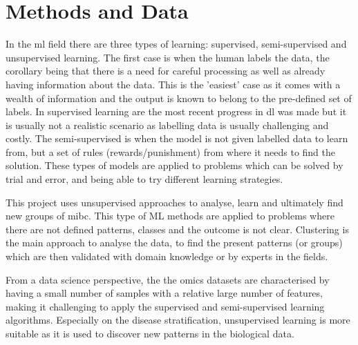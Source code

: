 \section{Methods and Data} \label{s:lit:computational}

\vspace{3mm}
\vspace{3mm}

In the \acrfull{ml} field there are three types of learning: supervised, semi-supervised and unsupervised learning. The first case is when the human labels the data, the corollary being that there is a need for careful processing as well as already having information about the data. This is the 'easiest' case as it comes with a wealth of information and the output is known to belong to the pre-defined set of labels. In supervised learning are the most recent progress in \acrfull{dl} was made but it is usually not a realistic scenario as labelling data is usually challenging and costly. The semi-supervised is when the model is not given labelled data to learn from, but a set of rules (rewards/punishment) from where it needs to find the solution. These types of models are applied to problems which can be solved by trial and error, and being able to try different learning strategies.

This project uses unsupervised approaches to analyse, learn and ultimately find new groups of \acrfull{mibc}. This type of ML methods are applied to problems where there are not defined patterns, classes and the outcome is not clear. Clustering is the main approach to analyse the data, to find the present patterns (or groups) which  are then validated with domain knowledge or by experts in the fields. 

From a data science perspective, the the omics datasets are characterised by having a small number of samples with a relative large number of features, making it challenging to apply the supervised and semi-supervised learning algorithms. Especially on the disease stratification, unsupervised learning is more suitable as it is used to discover new patterns in the biological data.

